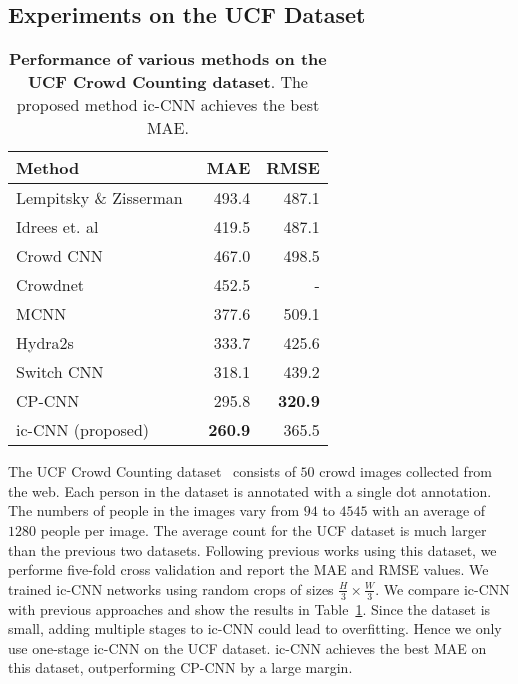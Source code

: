 \documentclass[runningheads]{llncs}
\begin{document}
\subsection{Experiments on the UCF Dataset}
\begin{table}[!h]
\centering
\caption{{\bf Performance of various methods on the UCF Crowd Counting dataset}. The proposed method ic-CNN achieves the best MAE. \label{tab:tableucf}}
\begin{tabular}{lrr}
\toprule
Method     & MAE   & RMSE   \\
\midrule
Lempitsky \& Zisserman~\cite{lempitsky2010learning}  & 493.4 & 487.1 \\
Idrees et. al~\cite{idrees2013multi}     &  419.5     & 487.1      \\
Crowd CNN ~\cite{zhang2015cross}     &    467.0   & 498.5      \\
Crowdnet~\cite{boominathan2016crowdnet}   &     452.5  & -      \\
MCNN~\cite{zhang2016single}      &   377.6    &  509.1     \\
Hydra2s ~\cite{onoro2016towards}  &    333.7   &  425.6    \\
Switch CNN~\cite{sam2017switching} &     318.1  &  439.2     \\
CP-CNN~\cite{sindagi2017generating} &295.8 & \textbf{320.9} \\
ic-CNN (proposed) &\textbf{260.9} & 365.5 \\
\bottomrule
\end{tabular}
\vskip 0.1in
\end{table}

The UCF Crowd Counting dataset~\cite{idrees2013multi} consists of $50$ crowd images collected from the web. Each person in the dataset is annotated with a single dot annotation. The numbers of people in the images vary from $94$ to $4545$ with an average of $1280$ people per image. The average count for the UCF dataset is much larger than the previous two datasets. Following previous works using this dataset,  we performe five-fold cross validation and report the MAE and RMSE values. We trained ic-CNN networks using random crops of sizes $\frac{H}{3}\times\frac{W}{3}$. We compare ic-CNN with previous approaches and show the results in Table~\ref{tab:tableucf}. Since the dataset is small, adding multiple stages to ic-CNN could lead to overfitting. Hence we only use one-stage ic-CNN on the UCF dataset. ic-CNN achieves the best MAE on this dataset, outperforming CP-CNN by a large margin.
\end{document}
